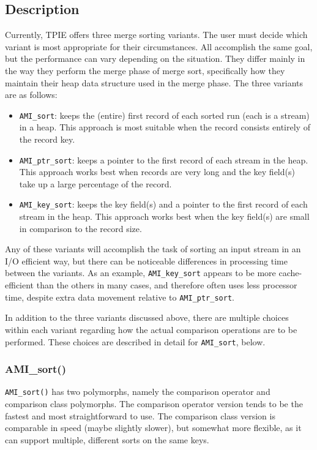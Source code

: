 \subsection{Description}
Currently, TPIE offers three
merge sorting variants. The user must decide which variant is most
appropriate for their circumstances.  All accomplish the same goal,
but the performance can vary depending on the situation. They differ
mainly in the way they perform the merge phase of merge sort,
specifically how they maintain their heap data structure used in the
merge phase. The three variants are as follows:
\begin{itemize}
\item \lstinline|AMI_sort|: keeps the (entire) first record of each
  sorted run (each is a stream) in a heap. This approach is most
  suitable when the record consists entirely of the record key.
    
\item \lstinline|AMI_ptr_sort|: keeps a pointer to the first record of
  each stream in the heap. This approach works best when records are
  very long and the key field(s) take up a large percentage of the
  record.
  
\item \lstinline|AMI_key_sort|: keeps the key field(s) and a pointer
  to the first record of each stream in the heap. This approach works
  best when the key field(s) are small in comparison to the record
  size.
\end{itemize}

Any of these variants will accomplish the task of sorting an input
stream in an I/O efficient way, but there can be noticeable
differences in processing time between the variants. As an example,
\lstinline|AMI_key_sort| appears to be more cache-efficient than the
others in many cases, and therefore often uses less processor time,
despite extra data movement relative to \lstinline|AMI_ptr_sort|.

In addition to the three variants discussed above, there are multiple
choices within each variant regarding how the actual comparison
operations are to be performed. These choices are described in detail
for \lstinline|AMI_sort|, below.

\subsubsection{AMI\_sort()}
\lstinline|AMI_sort()| has two polymorphs, namely the comparison
operator and comparison class polymorphs. The comparison operator
version tends to be the fastest and most straightforward to use. The
comparison class version is comparable in speed (maybe slightly
slower), but somewhat more flexible, as it can support multiple,
different sorts on the same keys.

